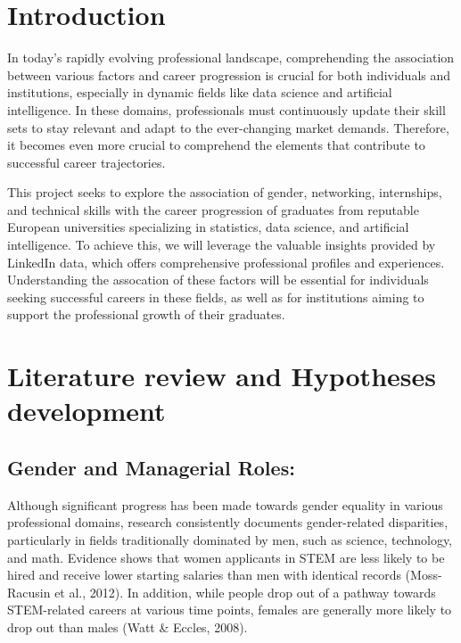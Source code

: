\documentclass[11pt,]{article}
\begin{document}
\vskip -8.5pt



\noindent 

\hypertarget{introduction}{%
\section{Introduction}\label{introduction}}

In today's rapidly evolving professional landscape, comprehending the
association between various factors and career progression is crucial
for both individuals and institutions, especially in dynamic fields like
data science and artificial intelligence. In these domains,
professionals must continuously update their skill sets to stay relevant
and adapt to the ever-changing market demands. Therefore, it becomes
even more crucial to comprehend the elements that contribute to
successful career trajectories.

This project seeks to explore the association of gender, networking,
internships, and technical skills with the career progression of
graduates from reputable European universities specializing in
statistics, data science, and artificial intelligence. To achieve this,
we will leverage the valuable insights provided by LinkedIn data, which
offers comprehensive professional profiles and experiences.
Understanding the assocation of these factors will be essential for
individuals seeking successful careers in these fields, as well as for
institutions aiming to support the professional growth of their
graduates.

\hypertarget{literature-review-and-hypotheses-development}{%
\section{Literature review and Hypotheses
development}\label{literature-review-and-hypotheses-development}}

\hypertarget{gender-and-managerial-roles}{%
\subsection{Gender and Managerial
Roles:}\label{gender-and-managerial-roles}}

Although significant progress has been made towards gender equality in
various professional domains, research consistently documents
gender-related disparities, particularly in fields traditionally
dominated by men, such as science, technology, and math. Evidence shows
that women applicants in STEM are less likely to be hired and receive
lower starting salaries than men with identical records (Moss-Racusin et
al., 2012). In addition, while people drop out of a pathway towards
STEM-related careers at various time points, females are generally more
likely to drop out than males (Watt \& Eccles, 2008).
\end{document}
